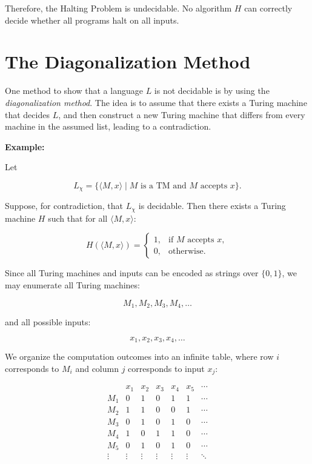\documentclass[12pt,a4paper,openany]{article}
\begin{document}
Therefore, the Halting Problem is undecidable. No algorithm $H$ can correctly decide whether all programs halt on all inputs.

\section{The Diagonalization Method}

One method to show that a language $L$ is not decidable is by using the
\emph{diagonalization method}.
The idea is to assume that there exists a Turing machine that decides $L$,
and then construct a new Turing machine that differs from every machine
in the assumed list, leading to a contradiction.

\textbf{Example:}

Let

\[
L_{\chi} = \{\langle M, x\rangle \mid M \text{ is a TM and } M \text{ accepts } x\}.
\]

Suppose, for contradiction, that $L_{\chi}$ is decidable. Then there exists a
Turing machine $H$ such that for all $\langle M, x \rangle$:

\[
H(\langle M, x \rangle) =
\begin{cases}
1, & \text{if } M \text{ accepts } x, \\
0, & \text{otherwise}.
\end{cases}
\]

Since all Turing machines and inputs can be encoded as strings over $\{0,1\}$,
we may enumerate all Turing machines:

\[
M_1, M_2, M_3, M_4, \ldots
\]

and all possible inputs:

\[
x_1, x_2, x_3, x_4, \ldots
\]

We organize the computation outcomes into an infinite table, where
row $i$ corresponds to $M_i$ and column $j$ corresponds to input $x_j$:

\[
\begin{array}{c|cccccc}
      & x_1 & x_2 & x_3 & x_4 & x_5 & \cdots \\ \hline
M_1 & \boxed{0} & 1 & 0 & 1 & 1 & \cdots \\
M_2 & 1 & \boxed{1} & 0 & 0 & 1 & \cdots \\
M_3 & 0 & 1 & \boxed{0} & 1 & 0 & \cdots \\
M_4 & 1 & 0 & 1 & \boxed{1} & 0 & \cdots \\
M_5 & 0 & 1 & 0 & 1 & \boxed{0} & \cdots \\
\vdots & \vdots & \vdots & \vdots & \vdots & \vdots & \ddots
\end{array}
\]
\end{document}
